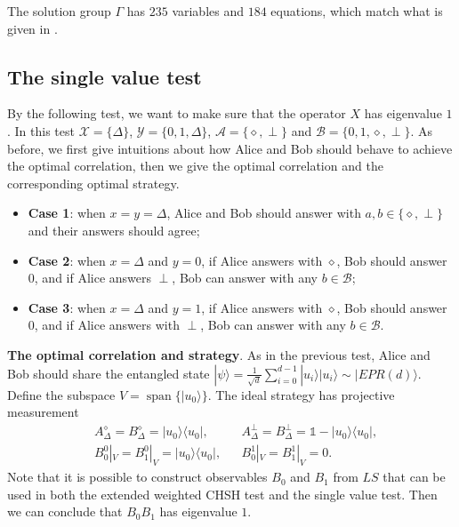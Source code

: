 \documentclass[11pt,letterpaper]{article}
\newcommand{\ket}[1]{|#1\rangle}
\newcommand{\ketbra}[2]{|#1\rangle\langle#2|}
\DeclareMathOperator{\spn}{span}
\newcommand{\calX}{\mathcal{X}}
\newcommand{\calY}{\mathcal{Y}}
\newcommand{\calA}{\mathcal{A}}
\newcommand{\calB}{\mathcal{B}}
\newcommand{\tri}{\Delta}
\newcommand{\1}{\mathbb{1}}
\theoremstyle{definition}
\begin{document}
The solution group $\Gamma$ has $235$ variables and $184$ equations, which match what is given in
\cite{slofstra2017}.

\subsection{The single value test}
By the following test, we want to make sure that the operator $X$ has eigenvalue $1$.
In this test $\calX = \{\tri \}$, $\calY = \{0,1,\tri\}$, $\calA = \{\diamond, \perp\}$ and $\calB = \{0,1, \diamond, \perp\}$.
As before, we first give intuitions about how Alice and Bob should behave to achieve the optimal correlation, then
we give the optimal correlation and the corresponding optimal strategy.
\begin{itemize}
	\item \textbf{Case 1}: when $x = y = \tri$, Alice and Bob should answer with $a, b \in \{\diamond, \perp\}$ and 
	their answers should agree;
	\item \textbf{Case 2}: when $x =\tri$ and $y = 0$, if Alice answers with $\diamond$, Bob should answer $0$, and if 
	Alice answers $\perp$, Bob can answer with any $b \in \calB$;
	\item \textbf{Case 3}: when $x = \tri$ and $y = 1$, if Alice answers with $\diamond$, Bob should answer $0$, and if  
	Alice answers with $\perp$, Bob can answer with any $b \in \calB$.
\end{itemize}

\textbf{The optimal correlation and strategy}.
As in the previous test, Alice and Bob should share the entangled state
$\ket{\psi} = \frac{1}{\sqrt{d}}\sum_{i=0}^{d-1} \ket{u_i}\ket{u_i} \sim \ket{EPR(d)}$.
Define the subspace $V = \spn\{ \ket{u_0} \}$.
The ideal strategy has projective measurement 
\begin{align*}
&A_\tri^\diamond = B_\tri^\diamond= \ketbra{u_0}{u_0}, 
&&A_\tri^\perp = B_\tri^\perp = \1 - \ketbra{u_0}{u_0},\\
&B_0^0|_V = B_1^0|_V = \ketbra{u_0}{u_0}, 
&&B_0^1|_V = B_1^1|_V = 0.
\end{align*}
Note that it is possible to construct observables $B_0$ and $B_1$ from $LS$
that can be used in both the extended weighted CHSH test and the single value test.
Then we can conclude that $B_0B_1$ has eigenvalue $1$.
\end{document}
